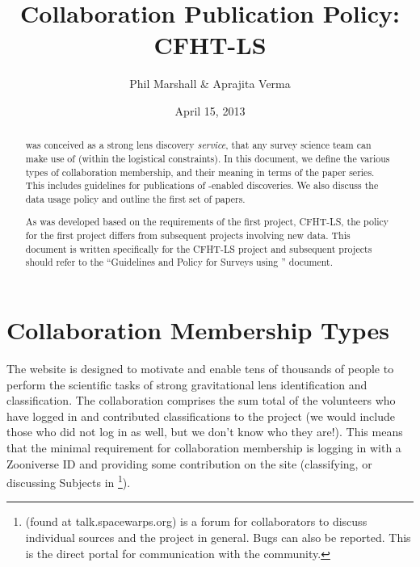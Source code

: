 \documentclass[a4paper]{article}
\begin{document}
             
\title{\SW Collaboration Publication Policy: CFHT-LS}
\author{Phil Marshall \& Aprajita Verma}
\date{April 15, 2013}
\maketitle


\begin{abstract} 
\noindent \sw was conceived as a strong lens
discovery {\it service}, that any survey science team can make use of
(within the logistical constraints). 
In this document, we define 
the various types of \sw
collaboration membership, and their meaning in terms of the \sw
paper series. This includes guidelines for publications of \sw-enabled discoveries. We also discuss the \sw data usage policy and outline the first set of \sw papers.

As \sw was developed based on the requirements of the first \sw project, CFHT-LS, the policy for the first project differs from subsequent \sw projects involving new data. This document is written specifically for the CFHT-LS project and subsequent projects should refer to the ``Guidelines and Policy for Surveys using \sw'' document.
\end{abstract}

\setcounter{footnote}{0}



\section{Collaboration Membership Types}
\label{sec:members}

The \sw website is designed to motivate and  enable tens of thousands of
people to perform the scientific tasks of strong gravitational lens
identification and classification.  The \sw collaboration comprises the
sum total of the volunteers who have logged in and contributed
classifications to the project (we would include those who did not
log in as well, but we don't know who they are!). This means that the
minimal requirement for \sw collaboration membership is logging in with a Zooniverse ID
and providing some contribution on the site (\ie classifying, or discussing
Subjects in \Talk \footnote{\Talk (found at talk.spacewarps.org) is a forum for \sw collaborators to discuss individual sources and the \sw project in general. Bugs can also be reported. This is the direct portal for communication with the \sw community.}).\\
\end{document}
